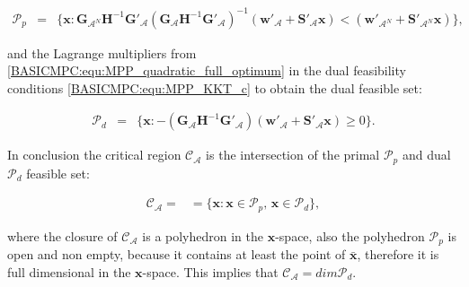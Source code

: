     \begin{equation}
    \begin{array}{rcl}
            \mathcal{P}_p&=&\{
            \textbf{x}:\textbf{G}_{\mathcal{A}^N}\textbf{H}^{-1}\textbf{G}'_{\mathcal{A}}(\textbf{G}_{\mathcal{A}}\textbf{H}^{-1}\textbf{G}'_{\mathcal{A}})^{-1}(\textbf{w}'_{\mathcal{A}}+\textbf{S}'_{\mathcal{A}}\textbf{x})
            <(\textbf{w}'_{\mathcal{A}^N}+\textbf{S}'_{\mathcal{A}^N}\textbf{x})
            \},
        \end{array}
        \label{BASICMPC:equ:MPP_quadratic_primalset}
    \end{equation}
    
    and the Lagrange multipliers from \ref{BASICMPC:equ:MPP_quadratic_full_optimum} in the dual feasibility conditions \ref{BASICMPC:equ:MPP_KKT_c} to obtain the dual feasible set:
    
    \begin{equation}
    \begin{array}{rcl}
            \mathcal{P}_d&=&\{
            \textbf{x}:-(\textbf{G}_{\mathcal{A}}\textbf{H}^{-1}\textbf{G}'_{\mathcal{A}})(\textbf{w}'_{\mathcal{A}}+\textbf{S}'_{\mathcal{A}}\textbf{x})\geq 0
            \}.
        \end{array}
        \label{BASICMPC:equ:MPP_quadratic_dualset}
    \end{equation}
    
    In conclusion the critical region $\mathcal{C}_{\mathcal{A}}$ is the intersection of the primal $\mathcal{P}_p$ and dual $\mathcal{P}_d$ feasible set:
    
    \begin{equation}
    \begin{array}{rcl}
            \mathcal{C}_{\mathcal{A}}=&=\{\textbf{x}:\textbf{x}\in\mathcal{P}_p,\,\textbf{x}\in\mathcal{P}_d\},
        \end{array}
        \label{BASICMPC:equ:MPP_quadratic_criticalset}
    \end{equation}
    
    where the closure of $\mathcal{C}_{\mathcal{A}}$ is a polyhedron in the $\textbf{x}$-space, also the polyhedron $\mathcal{P}_p$ is open and non empty, because it contains at least the point of $\bar{\textbf{x}}$, therefore it is full dimensional in the $\textbf{x}$-space. This implies that $\mathcal{C}_{\mathcal{A}}=dim\mathcal{P}_d$.
    
    \label{BASICCSR:sec:MPP_QP_Algo}
    
